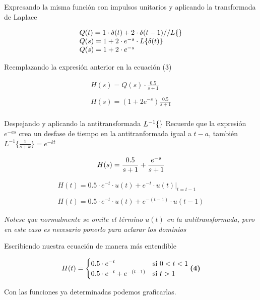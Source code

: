 \documentclass[
  letterpaper,
  DIV=11,
  numbers=noendperiod]{scrreprt}
\begin{document}
Expresando la misma función con impulsos unitarios y aplicando la
transformada de Laplace

\[
\begin{array}{l}
Q(t) = 1 \cdot \delta (t) + 2 \cdot \delta (t-1) \space\space\space\space //L\{\space\}\\
Q(s) = 1 + 2\cdot e^{-s}\cdot L\{ \delta (t) \}\\
Q(s) = 1 + 2 \cdot e^{-s}
\end{array}
\]

Reemplazando la expresión anterior en la ecuación (3)

\[
\begin{array}{l}
H(s)= Q(s)\cdot \frac{0.5}{s+1} \\
\\
H(s) = \left(1+2e^{-s}\right)\frac{0.5}{s+1}\\
\end{array}
\]

Despejando y aplicando la antitransformada \(L^{-1}\{\space\}\) Recuerde
que la expresión \(e^{-as}\) crea un desfase de tiempo en la
antitranformada igual a \(t-a\), también
\(L^{-1}\{\frac{1}{s+k}\}= e^{-kt}\)

\[
H(s) = \frac{0.5}{s+1}+\frac{e^{-s}}{s+1}\\
\]

\[
\begin{array}{l}
H(t) = 0.5\cdot e^{-t} \cdot u(t)+ e^{-t}\cdot u(t) |_{t=t-1}\\
\\
H(t) = 0.5\cdot e^{-t}\cdot u(t) + e^{-(t-1)} \cdot u(t-1)
\end{array}
\]

\emph{Notese que normalmente se omite el término \(u(t)\) en la
antitransformada, pero en este caso es necesario ponerlo para aclarar
los dominios}

Escribiendo nuestra ecuación de manera más entendible

\[
H(t)=
\begin{cases}
   0.5\cdot e^{-t} &\text{si }\space 0 < t < 1\\
   0.5\cdot e^{-t} + e^{-(t-1)} &\text{si } \space t>1\\
\end{cases} \space\space\space\space\space \textbf {(4)}
\]

Con las funciones ya determinadas podemos graficarlas.
\end{document}
